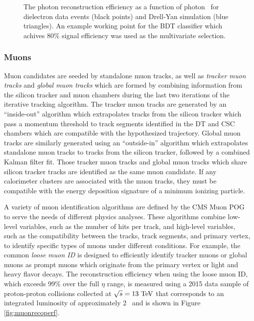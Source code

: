 \begin{figure}[htbp]
{  }
  \caption[Photon Reconstruction Efficiency]{The photon reconstruction efficiency as a function of photon \pT\ for dielectron data events (black points) and Drell-Yan simulation (blue triangles). An example working point for the BDT classifier which achives 80\% signal efficiency was used as the multivariate selection.\cite{CMSPHOTPERF}}
    \label{fig:photrecoeff}
\end{figure}

\subsubsection{Muons}

Muon candidates are seeded by standalone muon tracks, as well as \textit{tracker muon tracks} and \textit{global muon tracks} which are formed by combining information from the silicon tracker and muon chambers during the last two iterations of the iterative tracking algorithm. The tracker muon tracks are generated by an ``inside-out'' algorithm which extrapolates tracks from the silicon tracker which pass a momentum threshold to track segments identified in the DT and CSC chambers which are compatible with the hypothesized trajectory. Global muon tracks are similarly generated using an ``outside-in'' algorithm which extrapolates standalone muon tracks to tracks from the silicon tracker, followed by a combined Kalman filter fit. Those tracker muon tracks and global muon tracks which share silicon tracker tracks are identified as the same muon candidate. If any calorimeter clusters are associated with the muon tracks, they must be compatible with the energy deposition signature of a minimum ionizing particle.

A variety of muon identification algorithms are defined by the CMS Muon POG to serve the needs of different physics analyses. These algorithms combine low-level variables, such as the number of hits per track, and high-level variables, such as the compatibility between the tracks, track segments, and primary vertex, to identify specific types of muons under different conditions. For example, the common \textit{loose muon ID} is designed to efficiently identify tracker muons or global muons as prompt muons which originate from the primary vertex or light and heavy flavor decays.\cite{CMSMUONPERF} The reconstruction efficiency when using the loose muon ID, which exceeds 99\% over the full $\eta$ range, is measured using a 2015 data sample of proton-proton collisions collected at $\sqrt{s} = 13\ \mathrm{TeV}$ that corresponds to an integrated luminosity of approximately 2 \invfb\ and is shown in Figure \ref{fig:muonrecoperf}.

